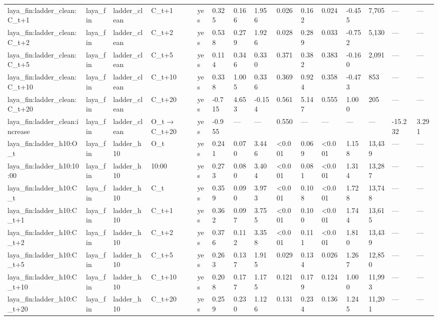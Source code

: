 \begin{tabular}{lllllllllllllll}
laya\_fin:ladder\_clean:C\_t+1 & laya\_fin & ladder\_clean & C\_t+1 & yes & 0.325 & 0.166 & 1.956 & 0.026 & 0.162 & 0.024 & -0.455 & 7,705 & — & — \\
laya\_fin:ladder\_clean:C\_t+2 & laya\_fin & ladder\_clean & C\_t+2 & yes & 0.538 & 0.279 & 1.926 & 0.028 & 0.289 & 0.033 & -0.752 & 5,130 & — & — \\
laya\_fin:ladder\_clean:C\_t+5 & laya\_fin & ladder\_clean & C\_t+5 & yes & 0.114 & 0.346 & 0.330 & 0.371 & 0.382 & 0.383 & -0.160 & 2,091 & — & — \\
laya\_fin:ladder\_clean:C\_t+10 & laya\_fin & ladder\_clean & C\_t+10 & yes & 0.338 & 1.005 & 0.336 & 0.369 & 0.924 & 0.358 & -0.473 & 853 & — & — \\
laya\_fin:ladder\_clean:C\_t+20 & laya\_fin & ladder\_clean & C\_t+20 & yes & -0.715 & 4.653 & -0.154 & 0.561 & 5.147 & 0.555 & 1.000 & 205 & — & — \\
laya\_fin:ladder\_clean:increase & laya\_fin & ladder\_clean & O\_t → C\_t+20 & yes & -0.955 & — & — & 0.550 & — & — & — & — & -15.232 & 3.291 \\
laya\_fin:ladder\_h10:O\_t & laya\_fin & ladder\_h10 & O\_t & yes & 0.241 & 0.070 & 3.446 & <0.001 & 0.069 & <0.001 & 1.158 & 13,439 & — & — \\
laya\_fin:ladder\_h10:10:00 & laya\_fin & ladder\_h10 & 10:00 & yes & 0.273 & 0.080 & 3.404 & <0.001 & 0.081 & <0.001 & 1.314 & 13,287 & — & — \\
laya\_fin:ladder\_h10:C\_t & laya\_fin & ladder\_h10 & C\_t & yes & 0.359 & 0.090 & 3.973 & <0.001 & 0.108 & <0.001 & 1.728 & 13,748 & — & — \\
laya\_fin:ladder\_h10:C\_t+1 & laya\_fin & ladder\_h10 & C\_t+1 & yes & 0.362 & 0.097 & 3.755 & <0.001 & 0.100 & <0.001 & 1.744 & 13,615 & — & — \\
laya\_fin:ladder\_h10:C\_t+2 & laya\_fin & ladder\_h10 & C\_t+2 & yes & 0.376 & 0.112 & 3.358 & <0.001 & 0.111 & <0.001 & 1.810 & 13,439 & — & — \\
laya\_fin:ladder\_h10:C\_t+5 & laya\_fin & ladder\_h10 & C\_t+5 & yes & 0.263 & 0.137 & 1.915 & 0.029 & 0.134 & 0.026 & 1.267 & 12,850 & — & — \\
laya\_fin:ladder\_h10:C\_t+10 & laya\_fin & ladder\_h10 & C\_t+10 & yes & 0.208 & 0.177 & 1.175 & 0.121 & 0.179 & 0.124 & 1.000 & 11,993 & — & — \\
laya\_fin:ladder\_h10:C\_t+20 & laya\_fin & ladder\_h10 & C\_t+20 & yes & 0.259 & 0.230 & 1.126 & 0.131 & 0.234 & 0.136 & 1.245 & 11,201 & — & — \\

\end{tabular}
